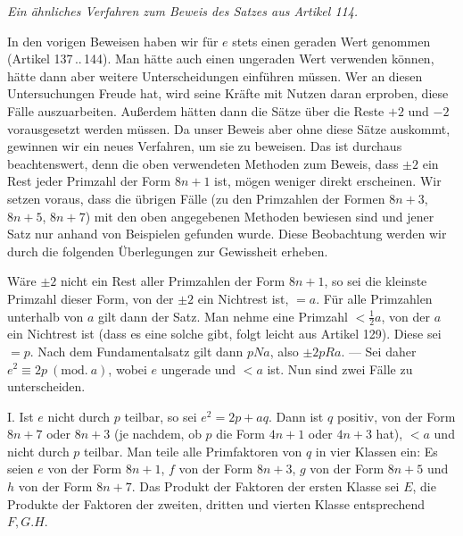 \begingroup
{}
\begin{center}\textit{Ein ähnliches Verfahren zum Beweis des Satzes aus Artikel 114.}\end{center}

In den vorigen Beweisen haben wir für $e$ stets einen geraden Wert genommen (Artikel 137\,..\,144). Man hätte auch einen ungeraden Wert verwenden können, hätte dann aber weitere Unterscheidungen einführen müssen. Wer an diesen Untersuchungen Freude hat, wird seine Kräfte mit Nutzen daran erproben, diese Fälle auszuarbeiten. Außerdem hätten dann die Sätze über die Reste $+2$ und $-2$ vorausgesetzt werden müssen. Da unser Beweis aber ohne diese Sätze auskommt, gewinnen wir ein neues Verfahren, um sie zu beweisen. Das ist durchaus beachtenswert, denn die oben verwendeten Methoden zum Beweis, dass $\pm2$ ein Rest jeder Primzahl der Form $8n+1$ ist, mögen weniger direkt erscheinen. Wir setzen voraus, dass die übrigen Fälle (zu den Primzahlen der Formen $8n+3$, $8n+5$, $8n+7$) mit den oben angegebenen Methoden bewiesen sind und jener Satz nur anhand von Beispielen gefunden wurde. Diese Beobachtung werden wir durch die folgenden Überlegungen zur Gewissheit erheben.

Wäre $\pm2$ nicht ein Rest aller Primzahlen der Form $8n+1$, so sei die kleinste Primzahl dieser Form, von der $\pm2$ ein Nichtrest ist, $=a$. Für alle Primzahlen unterhalb von $a$ gilt dann der Satz. Man nehme eine Primzahl $<\frac{1}{2}a$, von der $a$ ein Nichtrest ist (dass es eine solche gibt, folgt leicht aus Artikel 129). Diese sei $=p$. Nach dem Fundamentalsatz gilt dann $pNa$, also $\pm2pRa$. --- Sei daher $e^2\equiv2p\ (\mathrm{mod.}\ a)$, wobei $e$ ungerade und $<a$ ist. Nun sind zwei Fälle zu unterscheiden.

I. Ist $e$ nicht durch $p$ teilbar, so sei $e^2=2p+aq$. Dann ist $q$ positiv, von der Form $8n+7$ oder $8n+3$ (je nachdem, ob $p$ die Form $4n+1$ oder $4n+3$ hat), $<a$ und nicht durch $p$ teilbar. Man teile alle Primfaktoren von $q$ in vier Klassen ein: Es seien $e$ von der Form $8n+1$, $f$ von der Form $8n+3$, $g$ von der Form $8n+5$ und $h$ von der Form $8n+7$. Das Produkt der Faktoren der ersten Klasse sei $E$, die Produkte der Faktoren der zweiten, dritten und vierten Klasse entsprechend $F,G.H$.

